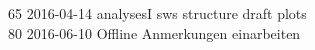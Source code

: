 \begin{footnotesize}
65	2016-04-14	analysesI sws structure draft plots\\
80	2016-06-10	Offline Anmerkungen einarbeiten\\

\end{footnotesize}
